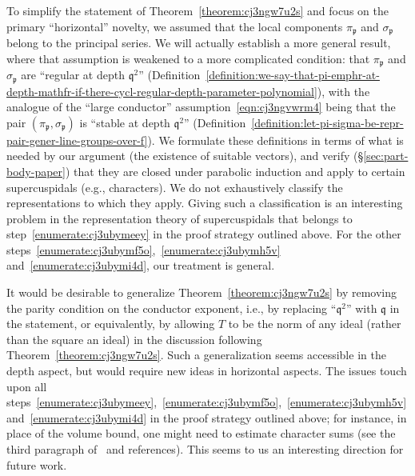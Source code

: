 \documentclass[reqno]{amsart}
\theoremstyle{plain} \newtheorem{theorem} {Theorem} \newtheorem{conjecture} {Conjecture} \newtheorem{corollary} [theorem] {Corollary} \newtheorem{proposition} [theorem] {Proposition} \newtheorem{fact} [theorem] {Fact}
\theoremstyle{definition} \newtheorem{definition} [theorem] {Definition}
\theoremstyle{itplain} %
\begin{document}
\begin{remark}\label{remark:cj3u9047n5}
  To simplify the statement of Theorem~\ref{theorem:cj3ngw7u2s} and focus on the primary ``horizontal'' novelty, we assumed that the local components $\pi_\mathfrak{p}$ and $\sigma_\mathfrak{p}$ belong to the principal series.  We will actually establish a more general result, where that assumption is weakened to a more complicated condition: that $\pi_\mathfrak{p}$ and $\sigma_\mathfrak{p}$ are ``regular at depth $\mathfrak{q}^2$'' (Definition~\ref{definition:we-say-that-pi-emphr-at-depth-mathfr-if-there-cycl-regular-depth-parameter-polynomial}), with the analogue of the ``large conductor'' assumption~\eqref{eqn:cj3ngvwrm4} being that the pair $(\pi_\mathfrak{p}, \sigma_\mathfrak{p})$ is ``stable at depth $\mathfrak{q}^2$'' (Definition~\ref{definition:let-pi-sigma-be-repr-pair-gener-line-groups-over-f}).  We formulate these definitions in terms of what is needed by our argument (the existence of suitable vectors), and verify (\S\ref{sec:part-body-paper}) that they are closed under parabolic induction and apply to certain supercuspidals (e.g., characters).  We do not exhaustively classify the representations to which they apply.  Giving such a classification is an interesting problem in the representation theory of supercuspidals that belongs to step~\eqref{enumerate:cj3ubymeey} in the proof strategy outlined above.  For the other steps~\eqref{enumerate:cj3ubymf5o},~\eqref{enumerate:cj3ubymh5v} and~\eqref{enumerate:cj3ubymi4d}, our treatment is general.  
\end{remark}
\begin{remark}\label{remark:cj3ubzzdb9}
  It would be desirable to generalize Theorem~\ref{theorem:cj3ngw7u2s} by removing the parity condition on the conductor exponent, i.e., by replacing ``$\mathfrak{q}^2$'' with $\mathfrak{q}$ in the statement, or equivalently, by allowing $T$ to be the norm of any ideal (rather than the square an ideal) in the discussion following Theorem~\ref{theorem:cj3ngw7u2s}.  Such a generalization seems accessible in the depth aspect, but would require new ideas in horizontal aspects.  The issues touch upon all steps~\eqref{enumerate:cj3ubymeey},~\eqref{enumerate:cj3ubymf5o},~\eqref{enumerate:cj3ubymh5v} and~\eqref{enumerate:cj3ubymi4d} in the proof strategy outlined above; for instance, in place of the volume bound, one might need to estimate character sums (see the third paragraph of~\cite[\S1.4]{2021arXiv210915230N} and references).  This seems to us an interesting direction for future work.
\end{remark}
\end{document}
